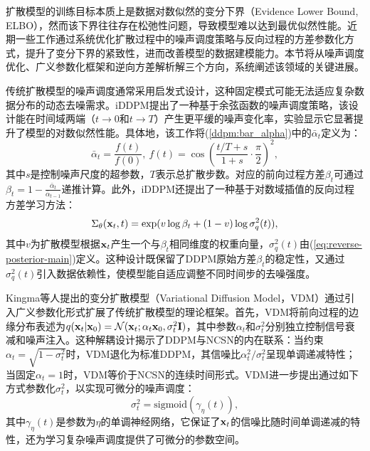 \documentclass[11pt,a4paper,UTF8]{ctexart}
\begin{document}
扩散模型的训练目标本质上是数据对数似然的变分下界（Evidence Lower Bound, ELBO），然而该下界往往存在松弛性问题，导致模型难以达到最优似然性能。近期一些工作通过系统优化扩散过程中的噪声调度策略与反向过程的方差参数化方式，提升了变分下界的紧致性，进而改善模型的数据建模能力。本节将从噪声调度优化、广义参数化框架和逆向方差解析解三个方向，系统阐述该领域的关键进展。

传统扩散模型的噪声调度通常采用启发式设计，这种固定模式可能无法适应复杂数据分布的动态去噪需求。iDDPM\cite{nichol2021improved}提出了一种基于余弦函数的噪声调度策略，该设计能在时间域两端（$t\rightarrow 0$和$t\rightarrow T$）产生更平缓的噪声变化率，实验显示它显著提升了模型的对数似然性能。具体地，该工作将(\ref{ddpm:bar_alpha})中的$\bar{\alpha}_t$定义为：
\begin{equation*}
    \bar{\alpha}_t=\frac{f(t)}{f(0)},\ f(t)=\cos\left(\frac{t/T+s}{1+s}\cdot\frac{\pi}{2}\right)^2,
\end{equation*}
其中$s$是控制噪声尺度的超参数，$T$表示总扩散步数。对应的前向过程方差$\beta_t$可通过$\beta_t=1-\frac{\bar{\alpha}_t}{\bar{\alpha}_{t-1}}$递推计算。此外，iDDPM还提出了一种基于对数域插值的反向过程方差学习方法：
\begin{equation*}
    \Sigma_\theta(\mathbf{x}_t,t)=\exp (v\log\beta_t + (1-v)\log \sigma_q^2(t)),
\end{equation*}
其中$v$为扩散模型根据$\mathbf{x}_t$产生一个与$\beta_t$相同维度的权重向量，$\sigma_q^2(t)$由(\ref{eq:reverse-posterior-main})定义。这种设计既保留了DDPM原始方差$\beta_t$的稳定性，又通过$\sigma_q^2(t)$引入数据依赖性，使模型能自适应调整不同时间步的去噪强度。

Kingma等人提出的变分扩散模型（Variational Diffusion Model，VDM）\cite{kingma2021variational}通过引入广义参数化形式扩展了传统扩散模型的理论框架。首先，VDM将前向过程的边缘分布表述为$q(\mathbf{x}_t|\mathbf{x}_0)=\mathcal{N}(\mathbf{x}_t;\alpha_t\mathbf{x}_0,\sigma_t^2\mathbf{I})$，其中参数$\alpha_t$和$\sigma_t^2$分别独立控制信号衰减和噪声注入。这种解耦设计揭示了DDPM与NCSN的内在联系：当约束$\alpha_t=\sqrt{1-\sigma_t^2}$时，VDM退化为标准DDPM，其信噪比$\alpha_t^2/\sigma_t^2$呈现单调递减特性；当固定$\alpha_t=1$时，VDM等价于NCSN的连续时间形式。VDM进一步提出通过如下方式参数化$\sigma_t^2$，以实现可微分的噪声调度：
\begin{equation*}
    \sigma_t^2=\text{sigmoid}(\gamma_\eta(t)),
\end{equation*}
其中$\gamma_\eta(t)$是参数为$\eta$的单调神经网络，它保证了$\mathbf{x}_t$的信噪比随时间单调递减的特性，还为学习复杂噪声调度提供了可微分的参数空间。
\end{document}
